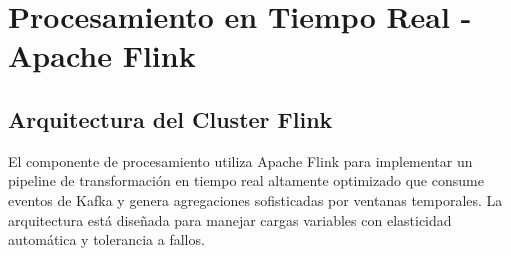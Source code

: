 
\section{Procesamiento en Tiempo Real - Apache Flink}
\label{sec:flink}

\subsection{Arquitectura del Cluster Flink}
\label{subsec:flink_cluster}

El componente de procesamiento utiliza Apache Flink para implementar un pipeline de transformación en tiempo real altamente optimizado que consume eventos de Kafka y genera agregaciones sofisticadas por ventanas temporales. La arquitectura está diseñada para manejar cargas variables con elasticidad automática y tolerancia a fallos.

\vspace{0.3cm}

